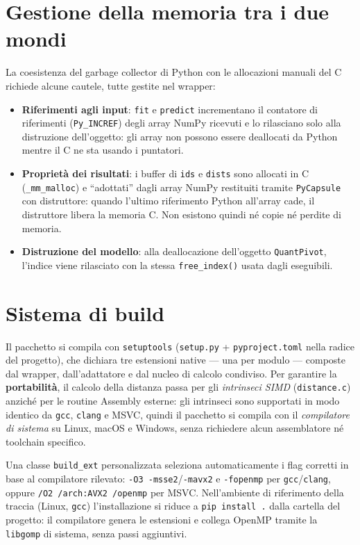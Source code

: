 \section{Gestione della memoria tra i due mondi}
La coesistenza del garbage collector di Python con le allocazioni manuali del C richiede alcune cautele, tutte gestite nel wrapper:

\begin{itemize}
    \item \textbf{Riferimenti agli input}: \texttt{fit} e \texttt{predict} incrementano il contatore di riferimenti (\texttt{Py\_INCREF}) degli array NumPy ricevuti e lo rilasciano solo alla distruzione dell'oggetto: gli array non possono essere deallocati da Python mentre il C ne sta usando i puntatori.
    \item \textbf{Proprietà dei risultati}: i buffer di \texttt{ids} e \texttt{dists} sono allocati in C (\texttt{\_mm\_malloc}) e ``adottati'' dagli array NumPy restituiti tramite \texttt{PyCapsule} con distruttore: quando l'ultimo riferimento Python all'array cade, il distruttore libera la memoria C. Non esistono quindi né copie né perdite di memoria.
    \item \textbf{Distruzione del modello}: alla deallocazione dell'oggetto \texttt{QuantPivot}, l'indice viene rilasciato con la stessa \texttt{free\_index()} usata dagli eseguibili.
\end{itemize}

\section{Sistema di build}
Il pacchetto si compila con \texttt{setuptools} (\texttt{setup.py} + \texttt{pyproject.toml} nella radice del progetto), che dichiara tre estensioni native — una per modulo — composte dal wrapper, dall'adattatore e dal nucleo di calcolo condiviso. Per garantire la \textbf{portabilità}, il calcolo della distanza passa per gli \emph{intrinseci SIMD} (\texttt{distance.c}) anziché per le routine Assembly esterne: gli intrinseci sono supportati in modo identico da \texttt{gcc}, \texttt{clang} e MSVC, quindi il pacchetto si compila con il \emph{compilatore di sistema} su Linux, macOS e Windows, senza richiedere alcun assemblatore né toolchain specifico.

Una classe \texttt{build\_ext} personalizzata seleziona automaticamente i flag corretti in base al compilatore rilevato: \texttt{-O3 -msse2}/\texttt{-mavx2} e \texttt{-fopenmp} per \texttt{gcc}/\texttt{clang}, oppure \texttt{/O2 /arch:AVX2 /openmp} per MSVC. Nell'ambiente di riferimento della traccia (Linux, \texttt{gcc}) l'installazione si riduce a \texttt{pip install .} dalla cartella del progetto: il compilatore genera le estensioni e collega OpenMP tramite la \texttt{libgomp} di sistema, senza passi aggiuntivi.

